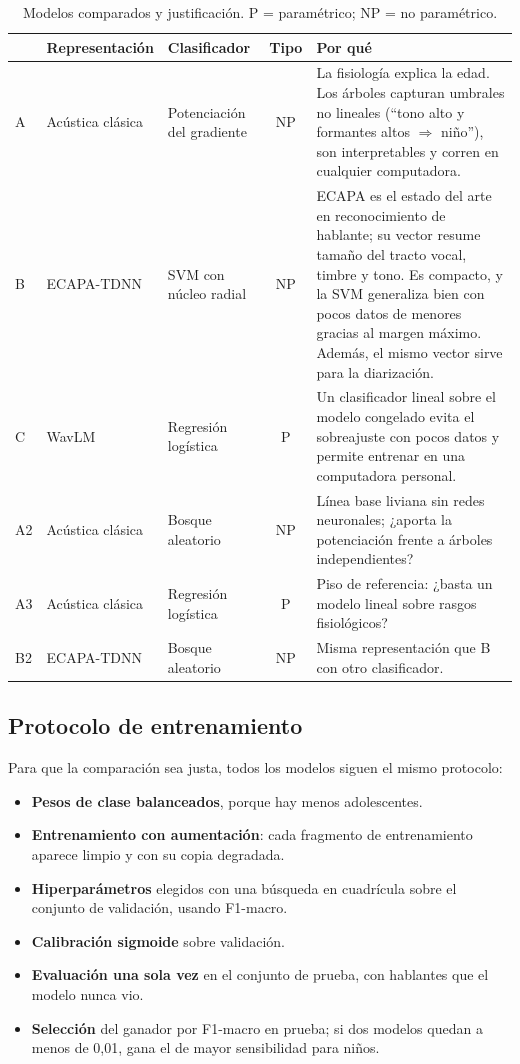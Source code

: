 \documentclass[11pt,a4paper]{article}
\begin{document}
\begin{table}[H]
\centering
\caption{Modelos comparados y justificación. P = paramétrico; NP = no paramétrico.}
\label{tab:modelos}
\small
\begin{tabularx}{\linewidth}{@{}l>{\raggedright\arraybackslash}p{2.75cm}>{\raggedright\arraybackslash}p{2.5cm}cL@{}}
\toprule
& \textbf{Representación} & \textbf{Clasificador} & \textbf{Tipo} & \textbf{Por qué} \\
\midrule
A & Acústica clásica & Potenciación del gradiente~\cite{sklearn2011} & NP & La fisiología explica la edad. Los árboles capturan umbrales no lineales (``tono alto y formantes altos $\Rightarrow$ niño''), son interpretables y corren en cualquier computadora. \\
B & ECAPA-TDNN & SVM con núcleo radial & NP & ECAPA es el estado del arte en reconocimiento de hablante; su vector resume tamaño del tracto vocal, timbre y tono. Es compacto, y la SVM generaliza bien con pocos datos de menores gracias al margen máximo. Además, el mismo vector sirve para la diarización. \\
C & WavLM & Regresión logística & P & Un clasificador lineal sobre el modelo congelado evita el sobreajuste con pocos datos y permite entrenar en una computadora personal. \\
A2 & Acústica clásica & Bosque aleatorio & NP & Línea base liviana sin redes neuronales; ¿aporta la potenciación frente a árboles independientes? \\
A3 & Acústica clásica & Regresión logística & P & Piso de referencia: ¿basta un modelo lineal sobre rasgos fisiológicos? \\
B2 & ECAPA-TDNN & Bosque aleatorio & NP & Misma representación que B con otro clasificador. \\
\bottomrule
\end{tabularx}
\end{table}

\subsection{Protocolo de entrenamiento}

Para que la comparación sea justa, todos los modelos siguen el mismo protocolo:
\begin{itemize}
  \item \textbf{Pesos de clase balanceados}, porque hay menos adolescentes.
  \item \textbf{Entrenamiento con aumentación}: cada fragmento de entrenamiento aparece limpio y con su copia degradada.
  \item \textbf{Hiperparámetros} elegidos con una búsqueda en cuadrícula sobre el conjunto de validación, usando F1-macro.
  \item \textbf{Calibración sigmoide} sobre validación.
  \item \textbf{Evaluación una sola vez} en el conjunto de prueba, con hablantes que el modelo nunca vio.
  \item \textbf{Selección} del ganador por F1-macro en prueba; si dos modelos quedan a menos de 0,01, gana el de mayor sensibilidad para niños.
\end{itemize}
\end{document}
